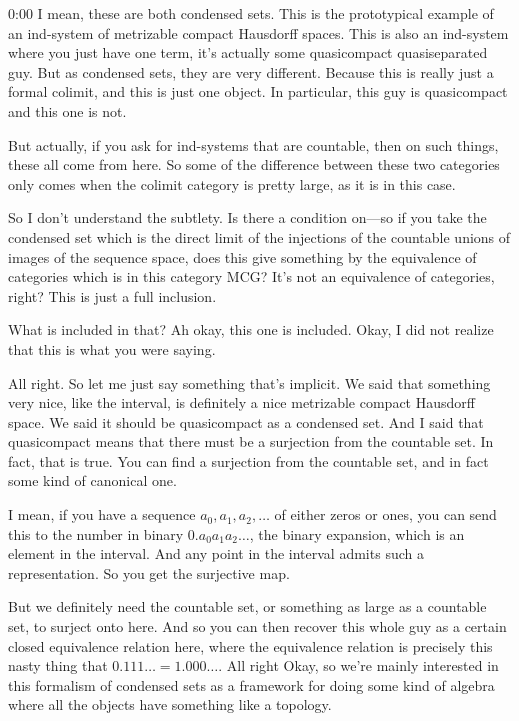\begin{unfinished}{0:00}
I mean, these are both condensed sets. This is the prototypical example of an ind-system of metrizable compact Hausdorff spaces. This is also an ind-system where you just have one term, it's actually some quasicompact quasiseparated guy. But as condensed sets, they are very different. Because this is really just a formal colimit, and this is just one object. In particular, this guy is quasicompact and this one is not.

But actually, if you ask for ind-systems that are countable, then on such things, these all come from here. So some of the difference between these two categories only comes when the colimit category is pretty large, as it is in this case.

So I don't understand the subtlety. Is there a condition on---so if you take the condensed set which is the direct limit of the injections of the countable unions of images of the sequence space, does this give something by the equivalence of categories which is in this category MCG? It's not an equivalence of categories, right? This is just a full inclusion.

What is included in that? Ah okay, this one is included. Okay, I did not realize that this is what you were saying. 

All right. So let me just say something that's implicit. We said that something very nice, like the interval, is definitely a nice metrizable compact Hausdorff space. We said it should be quasicompact as a condensed set. And I said that quasicompact means that there must be a surjection from the countable set. In fact, that is true. You can find a surjection from the countable set, and in fact some kind of canonical one.

I mean, if you have a sequence $a_0, a_1, a_2, \ldots$ of either zeros or ones, you can send this to the number in binary $0.a_0 a_1 a_2 \ldots$, the binary expansion, which is an element in the interval. And any point in the interval admits such a representation. So you get the surjective map.

But we definitely need the countable set, or something as large as a countable set, to surject onto here. And so you can then recover this whole guy as a certain closed equivalence relation here, where the equivalence relation is precisely this nasty thing that $0.111\ldots = 1.000\ldots$. All right
Okay, so we're mainly interested in this formalism of condensed sets as a framework for doing some kind of algebra where all the objects have something like a topology.


\end{unfinished}
